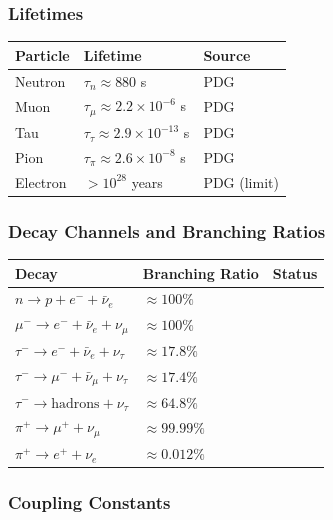 \subsubsection{Lifetimes}

\begin{center}
\begin{tabular}{lll}
\toprule
\textbf{Particle} & \textbf{Lifetime} & \textbf{Source} \\
\midrule
Neutron & $\tau_n \approx 880$ s & PDG \\
Muon & $\tau_\mu \approx 2.2 \times 10^{-6}$ s & PDG \\
Tau & $\tau_\tau \approx 2.9 \times 10^{-13}$ s & PDG \\
Pion & $\tau_\pi \approx 2.6 \times 10^{-8}$ s & PDG \\
Electron & $> 10^{28}$ years & PDG (limit) \\
\bottomrule
\end{tabular}
\end{center}

\subsubsection{Decay Channels and Branching Ratios}

\begin{center}
\begin{tabular}{lll}
\toprule
\textbf{Decay} & \textbf{Branching Ratio} & \textbf{Status} \\
\midrule
$n \to p + e^- + \bar\nu_e$ & $\approx 100\%$ & \tagBL{} \\
$\mu^- \to e^- + \bar\nu_e + \nu_\mu$ & $\approx 100\%$ & \tagBL{} \\
$\tau^- \to e^- + \bar\nu_e + \nu_\tau$ & $\approx 17.8\%$ & \tagBL{} \\
$\tau^- \to \mu^- + \bar\nu_\mu + \nu_\tau$ & $\approx 17.4\%$ & \tagBL{} \\
$\tau^- \to \text{hadrons} + \nu_\tau$ & $\approx 64.8\%$ & \tagBL{} \\
$\pi^+ \to \mu^+ + \nu_\mu$ & $\approx 99.99\%$ & \tagBL{} \\
$\pi^+ \to e^+ + \nu_e$ & $\approx 0.012\%$ & \tagBL{} \\
\bottomrule
\end{tabular}
\end{center}

\subsubsection{Coupling Constants}

